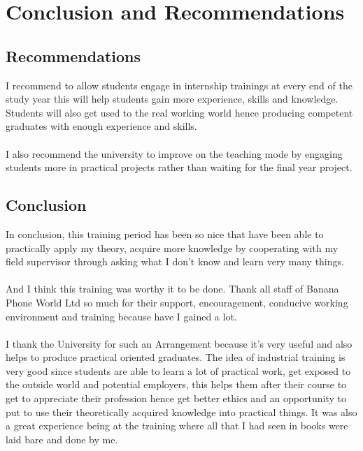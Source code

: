 \chapter{Conclusion and Recommendations}

\section{Recommendations}
I recommend to allow students engage in internship trainings at every end of the study year this will help students gain more experience, skills and knowledge. Students will also get used to the real working world hence producing competent graduates with enough experience and skills. \\ \\
I also recommend the university to improve on the teaching mode by engaging students more in practical projects rather than waiting for the final year project.

\section{Conclusion}
In conclusion, this training period has been so nice that have been able to practically apply my theory, acquire more knowledge by cooperating with my field supervisor through asking what I don’t know and learn very many things.  \\ \\
And I think this training was worthy it to be done. Thank all staff of Banana Phone World Ltd so much for their support, encouragement, conducive working environment and training because have I gained a lot. \\ \\
I thank the University for such an Arrangement because it’s very useful and also helps to produce practical oriented graduates. The idea of industrial training is very good since students are able to learn a lot of practical work, get exposed to the outside world and potential employers, this helps them after their course to get to appreciate their profession hence get better ethics and an opportunity to put to use their theoretically acquired knowledge into practical things. It was also a great experience being at the training where all that I had seen in books were laid bare and done by me.
